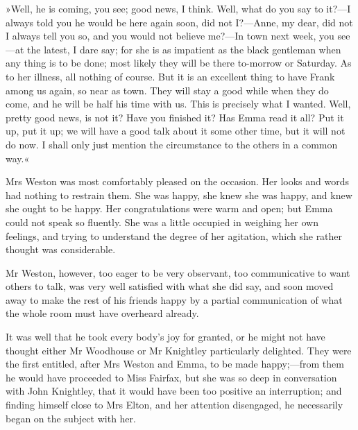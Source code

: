 »Well, he is coming, you see; good news, I think. Well, what do you say to it?—I always told you he would be here again soon, did not I?—Anne, my dear, did not I always tell you so, and you would not believe me?—In town next week, you see—at the latest, I dare say; for she is as impatient as the black gentleman when any thing is to be done; most likely they will be there to-morrow or Saturday. As to her illness, all nothing of course. But it is an excellent thing to have Frank among us again, so near as town. They will stay a good while when they do come, and he will be half his time with us. This is precisely what I wanted. Well, pretty good news, is not it? Have you finished it? Has Emma read it all? Put it up, put it up; we will have a good talk about it some other time, but it will not do now. I shall only just mention the circumstance to the others in a common way.«

Mrs Weston was most comfortably pleased on the occasion. Her looks and words had nothing to restrain them. She was happy, she knew she was happy, and knew she ought to be happy. Her congratulations were warm and open; but Emma could not speak so fluently. She was a little occupied in weighing her own feelings, and trying to understand the degree of her agitation, which she rather thought was considerable.

Mr Weston, however, too eager to be very observant, too communicative to want others to talk, was very well satisfied with what she did say, and soon moved away to make the rest of his friends happy by a partial communication of what the whole room must have overheard already.

It was well that he took every body's joy for granted, or he might not have thought either Mr Woodhouse or Mr Knightley particularly delighted. They were the first entitled, after Mrs Weston and Emma, to be made happy;—from them he would have proceeded to Miss Fairfax, but she was so deep in conversation with John Knightley, that it would have been too positive an interruption; and finding himself close to Mrs Elton, and her attention disengaged, he necessarily began on the subject with her.